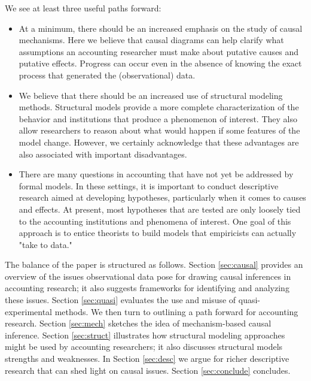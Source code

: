 \documentclass[11pt,reqno,titlepage]{amsart}
\begin{document}
\begin{doublespace}
We see at least three useful paths forward:

\vskip -10pt
\begin{itemize}
\item At a minimum, there should be an increased emphasis on the study of causal mechanisms. Here we believe that causal diagrams can help clarify what assumptions an accounting researcher must make 
about putative causes and putative effects. Progress can occur even in the absence of knowing the exact process that generated the (observational) data.
\item We believe that there should be an increased use of structural modeling methods. Structural models provide a more complete characterization of the behavior and institutions that produce a phenomenon of interest. They also allow researchers to reason about what would happen if some features of the model change. However, we certainly acknowledge that these advantages are also associated with important disadvantages. 	%
\item There are many questions in accounting that have not yet be addressed by formal models.  In these settings, it is important to conduct descriptive research aimed at developing hypotheses, particularly when it comes to causes and effects. At present, most hypotheses that are tested
are only loosely tied to the accounting institutions and phenomena of interest. One goal of this approach is to entice theorists to build models
that empiricists can actually "take to data."
\end{itemize}

\vskip 10pt
The balance of the paper is structured as follows.
Section \ref{sec:causal} provides an overview of the issues observational data pose for drawing causal inferences in accounting research; 
it also suggests frameworks for identifying and analyzing these issues.
Section \ref{sec:quasi} evaluates the use and misuse of quasi-experimental methods.
We then turn to outlining a path forward for accounting research.
Section \ref{sec:mech} sketches the idea of mechanism-based causal inference.
Section \ref{sec:struct} illustrates how structural modeling approaches might be used by accounting researchers; it also discusses structural models strengths and weaknesses.
In Section \ref{sec:desc} we argue for richer descriptive research that can shed light on causal issues.
Section \ref{sec:conclude} concludes.


\end{doublespace}
\end{document}
